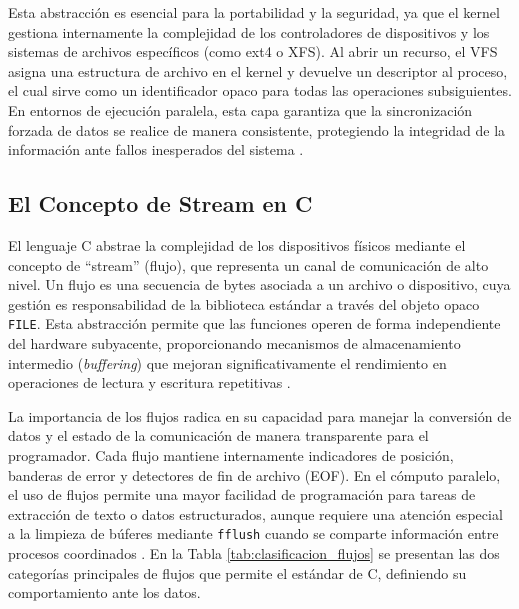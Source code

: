Esta abstracción es esencial para la portabilidad y la seguridad, ya que el kernel gestiona internamente la complejidad de los controladores de dispositivos y los sistemas de archivos específicos (como ext4 o XFS). Al abrir un recurso, el VFS asigna una estructura de archivo en el kernel y devuelve un descriptor al proceso, el cual sirve como un identificador opaco para todas las operaciones subsiguientes. En entornos de ejecución paralela, esta capa garantiza que la sincronización forzada de datos se realice de manera consistente, protegiendo la integridad de la información ante fallos inesperados del sistema \cite{ieee2017posix, linux_man}.

\subsection{El Concepto de Stream en C}

El lenguaje C abstrae la complejidad de los dispositivos físicos mediante el concepto de \enquote{stream} (flujo), que representa un canal de comunicación de alto nivel. Un flujo es una secuencia de bytes asociada a un archivo o dispositivo, cuya gestión es responsabilidad de la biblioteca estándar a través del objeto opaco \texttt{FILE}. Esta abstracción permite que las funciones operen de forma independiente del hardware subyacente, proporcionando mecanismos de almacenamiento intermedio (\textit{buffering}) que mejoran significativamente el rendimiento en operaciones de lectura y escritura repetitivas \cite{glibc_manual, iso2024c}.

La importancia de los flujos radica en su capacidad para manejar la conversión de datos y el estado de la comunicación de manera transparente para el programador. Cada flujo mantiene internamente indicadores de posición, banderas de error y detectores de fin de archivo (EOF). En el cómputo paralelo, el uso de flujos permite una mayor facilidad de programación para tareas de extracción de texto o datos estructurados, aunque requiere una atención especial a la limpieza de búferes mediante \texttt{fflush} cuando se comparte información entre procesos coordinados \cite{iso2024c, glibc_manual}. En la Tabla \ref{tab:clasificacion_flujos} se presentan las dos categorías principales de flujos que permite el estándar de C, definiendo su comportamiento ante los datos.

